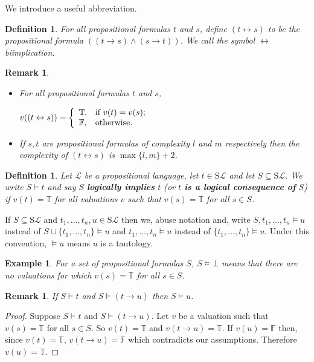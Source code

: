 \documentclass[11pt]{article}
\newcommand{\PF}{\mathrm{S}}
\newtheorem{example}[theorem]{Example}
\newtheorem{remark}[theorem]{Remark}
\newtheorem{definition}[theorem]{Definition}
\newcommand{\mcal}[1]{\mathcal{#1}}
\newcommand{\F}{\mathbb{F}}
\newcommand{\T}{\mathbb{T}}
\begin{document}
We introduce a useful abbreviation.

\begin{definition}
For all propositional formulas $t$ and $s$, define $(t\leftrightarrow s)$ to be the propositional formula $((t\rightarrow s)\wedge (s\rightarrow t))$. We call the symbol $\leftrightarrow$ biimplication.
\end{definition}

\begin{remark}\

\begin{itemize}
\item
For all propositional formulas $t$ and $s$,

$v((t\leftrightarrow s))=\left\{
                     \begin{array}{ll}
                       \T, & \hbox{if $v(t)=v(s)$;} \\
                       \F, & \hbox{otherwise.}
                     \end{array}
                   \right.
$
\item If $s,t$ are propositional formulas of complexity $l$ and $m$ respectively then the complexity of $(t\leftrightarrow s)$ is $\max\{l,m\}+2$.
\end{itemize}
\end{remark}





\begin{definition}
Let $\mcal{L}$ be a propositional language, let $t\in \PF\mcal{L}$ and let $S\subseteq \PF\mcal{L}$. We write $S\models t$ and say $S$ \textbf{logically implies} $t$ (or $t$ \textbf{is a logical consequence of} $S$) if $v(t)=\T$ for all valuations $v$ such that $v(s)=\T$ for all $s\in S$.
\end{definition}

If $S\subseteq \PF\mcal{L}$ and $t_1,\ldots,t_n,u\in\PF\mcal{L}$ then we, abuse notation and, write $S,t_1,\ldots,t_n\models u$ instead of $S\cup\{t_1,\ldots,t_n\}\models u$ and $t_1,\ldots,t_n\models u$ instead of $\{t_1,\ldots,t_n\}\models u$. Under this convention, $\models u$ means $u$ is a tautology.


\begin{example} For a set of propositional formulas $S$,
$S\models \bot$ means that there are no valuations for which $v(s)=\T$ for all $s\in S$.
\end{example}

\begin{remark}\label{modimp}
If $S\models t$ and $S\models (t\rightarrow u)$ then $S\models u$.
\end{remark}
\begin{proof} Suppose $S\models t$ and $S\models (t\rightarrow u)$.
Let $v$ be a valuation such that $v(s)=\T$ for all $s\in S$. So $v(t)=\T$ and $v(t\rightarrow u)=\T$. If $v(u)=\F$ then, since $v(t)=\T$, $v(t\rightarrow u)=\F$ which contradicts our assumptions. Therefore $v(u)=\T$.
\end{proof}
\end{document}
